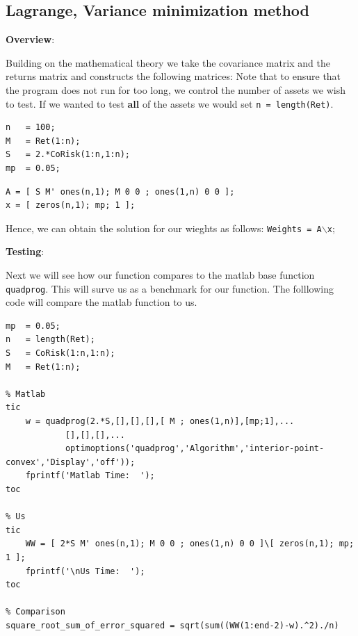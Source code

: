 \documentclass[12pt]{article}
\begin{document}
\subsection*{Lagrange, Variance minimization method}

\begin{par}
\textbf{Overview}:
\end{par} \vspace{1em}
\begin{par}
Building on the mathematical theory we take the covariance matrix and the returns matrix and constructs the following matrices: Note that to ensure that the program does not run for too long, we control the number of assets we wish to test. If we wanted to test \textbf{all} of the assets we would set \texttt{n = length(Ret)}.
\end{par} \vspace{1em}
\begin{verbatim}n   = 100;
M   = Ret(1:n);
S   = 2.*CoRisk(1:n,1:n);
mp  = 0.05;\end{verbatim}
\begin{verbatim}A = [ S M' ones(n,1); M 0 0 ; ones(1,n) 0 0 ];
x = [ zeros(n,1); mp; 1 ];\end{verbatim}
\begin{par}
Hence, we can obtain the solution for our wieghts as follows: \texttt{Weights = A\ensuremath{\backslash}x};
\end{par} \vspace{1em}
\begin{par}
\textbf{Testing}:
\end{par} \vspace{1em}
\begin{par}
Next we will see how our function compares to the matlab base function \texttt{quadprog}. This will surve us as a benchmark for our function. The folllowing code will compare the matlab function to us.
\end{par} \vspace{1em}
\begin{verbatim}
mp  = 0.05;
n   = length(Ret);
S   = CoRisk(1:n,1:n);
M   = Ret(1:n);

% Matlab
tic
    w = quadprog(2.*S,[],[],[],[ M ; ones(1,n)],[mp;1],...
            [],[],[],...
            optimoptions('quadprog','Algorithm','interior-point-convex','Display','off'));
    fprintf('Matlab Time:  ');
toc

% Us
tic
    WW = [ 2*S M' ones(n,1); M 0 0 ; ones(1,n) 0 0 ]\[ zeros(n,1); mp; 1 ];
    fprintf('\nUs Time:  ');
toc

% Comparison
square_root_sum_of_error_squared = sqrt(sum((WW(1:end-2)-w).^2)./n)
\end{verbatim}
\end{document}

